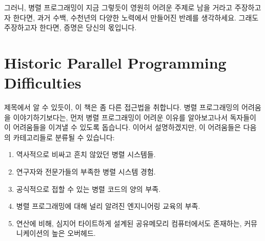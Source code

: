 그러니, 병렬 프로그래밍이 지금 그렇듯이 영원히 어려운 주제로 남을 거라고
주장하고자 한다면, 과거 수백, 수천년의 다양한 노력에서 만들어진 반례를
생각하세요. 그래도 주장하고자 한다면, 증명은 당신의 몫입니다.

\section{Historic Parallel Programming Difficulties}
\label{sec:intro:Historic Parallel Programming Difficulties}

제목에서 알 수 있듯이, 이 책은 좀 다른 접근법을 취합니다.
병렬 프로그래밍의 어려움을 이야기하기보다는, 먼저 병렬 프로그래밍이 어려운
이유를 알아보고나서 독자들이 이 어려움들을 이겨낼 수 있도록 돕습니다.
이어서 설명하겠지만, 이 어려움들은 다음의 카테고리들로 분류될 수 있습니다:

\begin{enumerate}
\item	역사적으로 비싸고 흔치 않았던 병렬 시스템들.
\item	연구자와 전문가들의 부족한 병렬 시스템 경험.
\item	공식적으로 접할 수 있는 병렬 코드의 양의 부족.
\item	병렬 프로그래밍에 대해 널리 알려진 엔지니어링 교육의 부족.
\item	연산에 비해, 심지어 타이트하게 설계된 공유메모리 컴퓨터에서도 존재하는,
	커뮤니케이션의 높은 오버헤드.
\end{enumerate}

